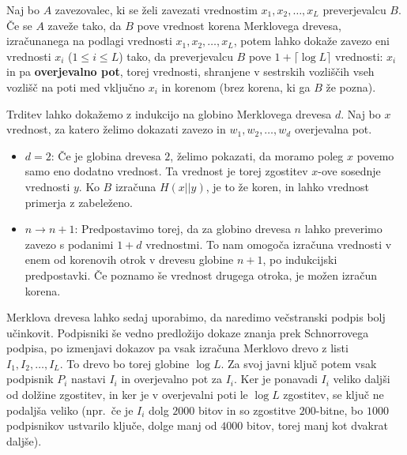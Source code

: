 \documentclass[isrm2, tisk]{fmfdelo}
\begin{document}
\begin{trditev}
\label{trd:overjevalna_pot}
    Naj bo $A$ zavezovalec, ki se želi zavezati vrednostim $x_1, x_2, \dots, x_L$ preverjevalcu $B$. Če 
    se $A$ zaveže tako, da $B$ pove vrednost korena Merklovega drevesa, izračunanega na podlagi 
    vrednosti $x_1, x_2, \dots, x_L$, potem lahko dokaže zavezo eni vrednosti $x_i$ ($1 \le i \le L$)
    tako, da preverjevalcu $B$ pove $1 + \lceil \log L \rceil$ vrednosti: $x_i$ in pa \textbf{overjevalno 
    pot}, torej vrednosti, shranjene v sestrskih vozliščih vseh vozlišč na poti med vključno $x_i$ in 
    korenom (brez korena, ki ga $B$ že pozna).
\end{trditev}

\begin{dokaz}
    Trditev lahko dokažemo z indukcijo na globino Merklovega drevesa $d$. Naj bo $x$ vrednost, za katero
    želimo dokazati zavezo in $w_1, w_2, \dots, w_d$ overjevalna pot.
    \begin{itemize}
        \item $d = 2$: Če je globina drevesa $2$, želimo pokazati, da moramo poleg $x$ povemo samo eno  
            dodatno vrednost. Ta vrednost je torej zgostitev $x$-ove sosednje vrednosti $y$. Ko $B$ izračuna
            $H(x || y)$, je to že koren, in lahko vrednost primerja z zabeleženo.
        \item $n \rightarrow n + 1$: Predpostavimo torej, da za globino drevesa $n$ lahko preverimo zavezo s 
            podanimi $1 + d$ vrednostmi. To nam omogoča izračuna vrednosti v enem od korenovih otrok v 
            drevesu globine $n + 1$, po indukcijski predpostavki. Če poznamo še vrednost drugega otroka, je 
            možen izračun korena.
    \end{itemize}
\end{dokaz}

Merklova drevesa lahko sedaj uporabimo, da naredimo večstranski podpis bolj učinkovit. Podpisniki
še vedno predložijo dokaze znanja prek Schnorrovega podpisa, po izmenjavi dokazov pa vsak izračuna 
Merklovo drevo z listi $I_1, I_2, \dots, I_L$. To drevo bo torej globine $\log L$. Za svoj javni 
ključ potem vsak podpisnik $P_i$ nastavi $I_i$ in overjevalno pot za $I_i$. Ker je ponavadi $I_i$ 
veliko daljši od dolžine zgostitev, in ker je v overjevalni poti le $\log L$ zgostitev, se ključ 
ne podaljša veliko (npr.\, če je $I_i$ dolg $2000$ bitov in so zgostitve $200$-bitne, bo $1000$ 
podpisnikov ustvarilo ključe, dolge manj od $4000$ bitov, torej manj kot dvakrat daljše).
\end{document}

